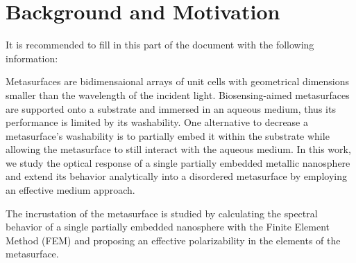 
\chapter*{Background and Motivation}
\label{chapter:intro}


 It is recommended to fill in this part of the document with the following information:

Metasurfaces are bidimensaional arrays of unit cells with geometrical dimensions smaller than the wavelength of the incident light. Biosensing-aimed metasurfaces are supported onto a substrate and immersed in an aqueous medium, thus its performance is limited by its washability. One alternative to decrease a metasurface's washability is to partially embed it within the substrate while allowing the metasurface to still interact with the aqueous medium. In this work, we study the optical response of a single partially embedded metallic nanosphere  and extend its behavior analytically into a disordered metasurface by employing an effective medium approach.

The incrustation of the metasurface is studied by calculating the spectral behavior of a single partially embedded nanosphere with the Finite Element Method (FEM) and proposing an effective polarizability  in the elements of the metasurface.

